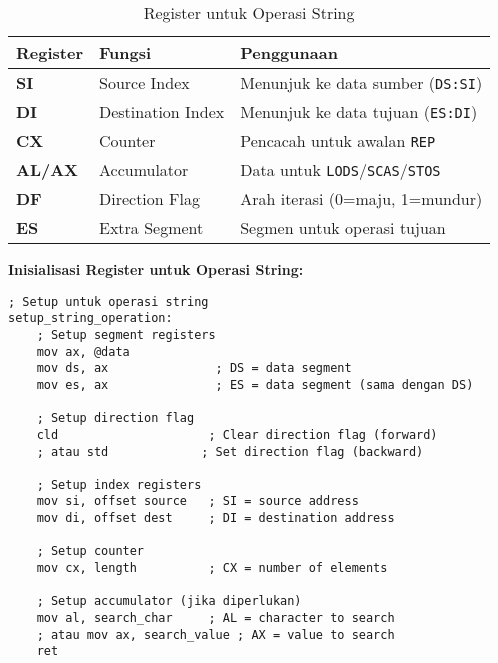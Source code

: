 \documentclass[../main.tex]{subfiles}
\begin{document}
            \begin{table}[H]
                \centering
                \caption{Register untuk Operasi String}
                \begin{tabular}{|p{2cm}|p{4cm}|p{7cm}|}
                    \hline
                    \textbf{Register} & \textbf{Fungsi} & \textbf{Penggunaan} \\
                    \hline
                    \textbf{SI} & Source Index & Menunjuk ke data sumber (\texttt{DS:SI}) \\
                    \hline
                    \textbf{DI} & Destination Index & Menunjuk ke data tujuan (\texttt{ES:DI}) \\
                    \hline
                    \textbf{CX} & Counter & Pencacah untuk awalan \texttt{REP} \\
                    \hline
                    \textbf{AL/AX} & Accumulator & Data untuk \texttt{LODS}/\texttt{SCAS}/\texttt{STOS} \\
                    \hline
                    \textbf{DF} & Direction Flag & Arah iterasi (0=maju, 1=mundur) \\
                    \hline
                    \textbf{ES} & Extra Segment & Segmen untuk operasi tujuan \\
                    \hline
                \end{tabular}
                \label{tab:string-registers}
            \end{table}

            \textbf{Inisialisasi Register untuk Operasi String:}
            \begin{lstlisting}[language={[x86masm]Assembler}, caption=Inisialisasi Register String, label={lst:string-register-init}]
; Setup untuk operasi string
setup_string_operation:
    ; Setup segment registers
    mov ax, @data
    mov ds, ax               ; DS = data segment
    mov es, ax               ; ES = data segment (sama dengan DS)
    
    ; Setup direction flag
    cld                     ; Clear direction flag (forward)
    ; atau std             ; Set direction flag (backward)
    
    ; Setup index registers
    mov si, offset source   ; SI = source address
    mov di, offset dest     ; DI = destination address
    
    ; Setup counter
    mov cx, length          ; CX = number of elements
    
    ; Setup accumulator (jika diperlukan)
    mov al, search_char     ; AL = character to search
    ; atau mov ax, search_value ; AX = value to search
    ret
            \end{lstlisting}
\end{document}
